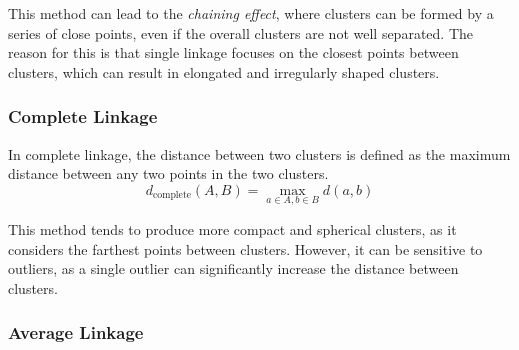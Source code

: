 This method can lead to the \emph{chaining effect}, where clusters can be formed by a series of close points, even if the overall clusters are not well separated. The reason for this is that single linkage focuses on the closest points between clusters, which can result in elongated and irregularly shaped clusters.

\subsubsection{Complete Linkage}

In complete linkage, the distance between two clusters is defined as the maximum distance between any two points in the two clusters.
\begin{equation*}
    d_{\text{complete}}(A, B) = \max_{a\in A, b\in B} d(a, b)
\end{equation*}

This method tends to produce more compact and spherical clusters, as it considers the farthest points between clusters. However, it can be sensitive to outliers, as a single outlier can significantly increase the distance between clusters.

\subsubsection{Average Linkage}

